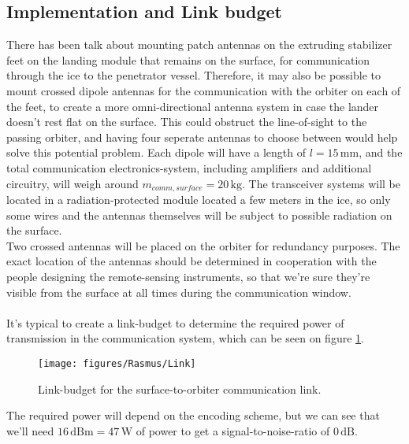\iffalse
\begin{figure}[htb]
	\centering
	\texttt{[image: figures/Rasmus/CrossDip]}
	\caption{Crossed half-wave dipole antenna drawing.
	\label{fig:DrossDip}}
\end{figure}
\fi

\subsection{Implementation and Link budget}
There has been talk about mounting patch antennas on the extruding stabilizer feet on the landing module that remains on the surface, for communication through the ice to the penetrator vessel. Therefore, it may also be possible to mount crossed dipole antennas for the communication with the orbiter on each of the feet, to create a more omni-directional antenna system in case the lander doesn't rest flat on the surface. This could obstruct the line-of-sight to the passing orbiter, and having four seperate antennas to choose between would help solve this potential problem. Each dipole will have a length of $l=15\,\mathrm{mm}$, and the total communication electronics-system, including amplifiers and additional circuitry, will weigh around $m_{comm,surface}=20\,\mathrm{kg}$. The transceiver systems will be located in a radiation-protected module located a few meters in the ice, so only some wires and the antennas themselves will be subject to possible radiation on the surface.\\
Two crossed antennas will be placed on the orbiter for redundancy purposes. The exact location of the antennas should be determined in cooperation with the people designing the remote-sensing instruments, so that we're sure they're visible from the surface at all times during the communication window.\\
\\
It's typical to create a link-budget to determine the required power of transmission in the communication system, which can be seen on figure \ref{fig:surfLink}.
\begin{figure}[!htb]
	\centering
	\texttt{[image: figures/Rasmus/Link]}
	\caption{Link-budget for the surface-to-orbiter communication link.
	\label{fig:surfLink}}
\end{figure}
The required power will depend on the encoding scheme, but we can see that we'll need $16\,\mathrm{dBm}=47\,\mathrm{W}$ of power to get a signal-to-noise-ratio of $0\,\mathrm{dB}$.\\
